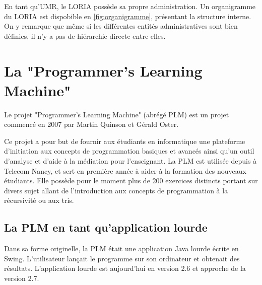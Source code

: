 \documentclass[stage]{tnreport}
\begin{document}
En tant qu'UMR, le LORIA possède sa propre administration. Un organigramme du LORIA est dispobible en \ref{fig:organigramme}, présentant la structure interne. On y remarque que même si les différentes entités administratives sont bien définies, il n'y a pas de hiérarchie directe entre elles.


\section{La "Programmer's Learning Machine"}

Le projet "Programmer's Learning Machine" (abrégé PLM) est un projet commencé en 2007 par Martin Quinson et Gérald Oster.

Ce projet a pour but de fournir aux étudiants en informatique une plateforme d'initiation aux concepts de programmation basiques et avancés ainsi qu'un outil d'analyse et d'aide à la médiation pour l'enseignant.
La PLM est utilisée depuis à Telecom Nancy, et sert en première année à aider à la formation des nouveaux étudiants. Elle possède pour le moment plus de 200 exercices distincts portant sur divers sujet allant de l'introduction aux concepts de programmation à la récursivité ou aux tris.

\subsection{La PLM en tant qu'application lourde}

Dans sa forme originelle, la PLM était une application Java lourde écrite en Swing. L'utilisateur lançait le programme sur son ordinateur et obtenait des résultats. L'application lourde est aujourd'hui en version 2.6 et approche de la version 2.7.
\end{document}
